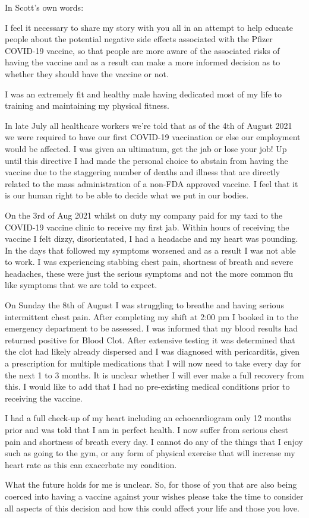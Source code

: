 In Scott’s own words:

I feel it necessary to share my story with you all in an attempt to help educate
people about the potential negative side effects associated with the Pfizer
COVID-19 vaccine, so that people are more aware of the associated risks of
having the vaccine and as a result can make a more informed decision as to
whether they should have the vaccine or not.

I was an extremely fit and healthy male having dedicated most of my life to
training and maintaining my physical fitness.

In late July all healthcare workers we’re told that as of the 4th of August 2021
we were required to have our first COVID-19 vaccination or else our employment
would be affected. I was given an ultimatum, get the jab or lose your job! Up
until this directive I had made the personal choice to abstain from having the
vaccine due to the staggering number of deaths and illness that are directly
related to the mass administration of a non-FDA approved vaccine. I feel that it
is our human right to be able to decide what we put in our bodies.

On the 3rd of Aug 2021 whilst on duty my company paid for my taxi to the
COVID-19 vaccine clinic to receive my first jab. Within hours of receiving the
vaccine I felt dizzy, disorientated, I had a headache and my heart was
pounding. In the days that followed my symptoms worsened and as a result I was
not able to work. I was experiencing stabbing chest pain, shortness of breath
and severe headaches, these were just the serious symptoms and not the more
common flu like symptoms that we are told to expect.

On Sunday the 8th of August I was struggling to breathe and having serious
intermittent chest pain. After completing my shift at 2:00 pm I booked in to the
emergency department to be assessed. I was informed that my blood results had
returned positive for Blood Clot. After extensive testing it was determined that
the clot had likely already dispersed and I was diagnosed with pericarditis,
given a prescription for multiple medications that I will now need to take every
day for the next 1 to 3 months. It is unclear whether I will ever make a full
recovery from this. I would like to add that I had no pre-existing medical
conditions prior to receiving the vaccine.

I had a full check-up of my heart including an echocardiogram only 12 months
prior and was told that I am in perfect health. I now suffer from serious chest
pain and shortness of breath every day. I cannot do any of the things that I
enjoy such as going to the gym, or any form of physical exercise that will
increase my heart rate as this can exacerbate my condition.

What the future holds for me is unclear. So, for those of you that are also
being coerced into having a vaccine against your wishes please take the time to
consider all aspects of this decision and how this could affect your life and
those you love.

